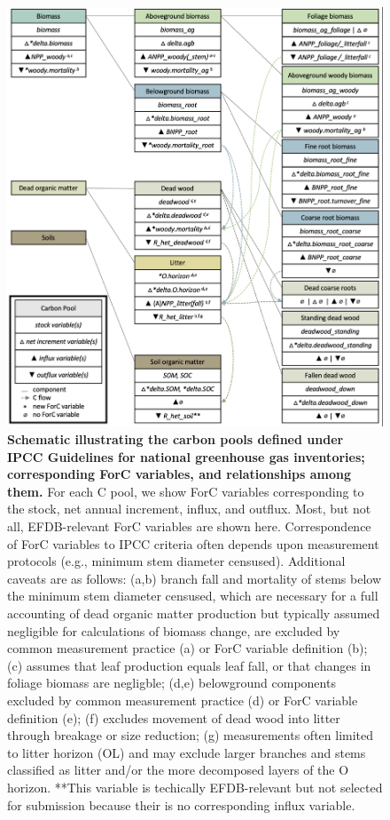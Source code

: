 \documentclass[, manuscript]{copernicus}
\begin{document}
\begin{figure}
\includegraphics[width=14cm]{figures_tables/C_variable_mapping} \caption{\textbf{Schematic illustrating the carbon pools defined under IPCC Guidelines for national greenhouse gas inventories; corresponding ForC variables, and relationships among them.} For each C pool, we show ForC variables corresponding to the stock, net annual increment, influx, and outflux. Most, but not all, EFDB-relevant ForC variables are shown here. Correspondence of ForC variables to IPCC criteria often depends upon measurement protocols (e.g., minimum stem diameter censused). Additional caveats are as follows: (a,b) branch fall and mortality of stems below the minimum stem diameter censused, which are necessary for a full accounting of dead organic matter production but typically assumed negligible for calculations of biomass change, are excluded by common measurement practice (a) or ForC variable definition (b); (c) assumes that leaf production equals leaf fall, or that changes in foliage biomass are negligble; (d,e) belowground components excluded by common measurement practice (d) or ForC variable definition (e); (f) excludes movement of dead wood into litter through breakage or size reduction; (g) measurements often limited to litter horizon (OL) and may exclude larger branches and stems classified as litter and/or the more decomposed layers of the O horizon. **This variable is techically EFDB-relevant but not selected for submission because their is no corresponding influx variable.}\label{fig:fig_variable_mapping}
\end{figure}
\end{document}
